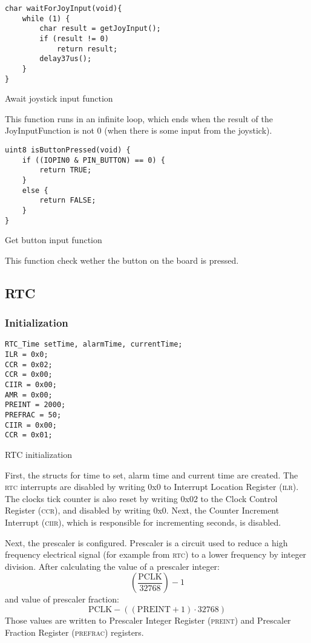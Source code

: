 \documentclass[10pt]{article}
\begin{document}
\begin{program}[H]
	\begin{lstlisting}
char waitForJoyInput(void){
    while (1) {
        char result = getJoyInput();
        if (result != 0)
            return result;
        delay37us();
    }
}
	\end{lstlisting}
	\caption{Await joystick input function}
\end{program}
This function runs in an infinite loop, which ends when the result of the JoyInputFunction is not 0 (when there is some input from the joystick).

\begin{program}    
	\begin{lstlisting}
uint8 isButtonPressed(void) {
    if ((IOPIN0 & PIN_BUTTON) == 0) {
        return TRUE;
    }
    else {
        return FALSE;
    }
}
	\end{lstlisting}
	\caption{Get button input function}
\end{program}      
This function check wether the button on the board is pressed.

\subsection{RTC}
\subsubsection{Initialization}
\begin{program}[H]
	\begin{lstlisting}
RTC_Time setTime, alarmTime, currentTime;
ILR = 0x0; 
CCR = 0x02; 
CCR = 0x00;
CIIR = 0x00;
AMR = 0x00;  
PREINT = 2000;
PREFRAC = 50;
CIIR = 0x00;
CCR = 0x01;
	\end{lstlisting}
	\caption{RTC initialization}
\end{program}

First, the structs for time to set, alarm time and current time are created. The \textsc{rtc} interrupts are disabled by writing 0x0 to Interrupt Location Register (\textsc{ilr}).  The clocks tick counter is also reset by writing 0x02 to the Clock Control Register (\textsc{ccr}), and disabled by writing 0x0. Next, the Counter Increment Interrupt (\textsc{ciir}), which is responsible for incrementing seconds, is disabled. 

Next, the prescaler is configured. Prescaler is a circuit used to reduce a high frequency electrical signal (for example from \textsc{rtc}) to a lower frequency by integer division. After calculating the value of a prescaler integer:
\[ \left(\frac{\mathrm{PCLK}}{32768}\right) - 1 \]
and value of prescaler fraction:
\[ \mathrm{PCLK} - \left((\mathrm{PREINT} + 1) \cdot 32768\right) \]
Those values are written to Prescaler Integer Register (\textsc{preint}) and Prescaler Fraction Register (\textsc{prefrac}) registers.
\end{document}
